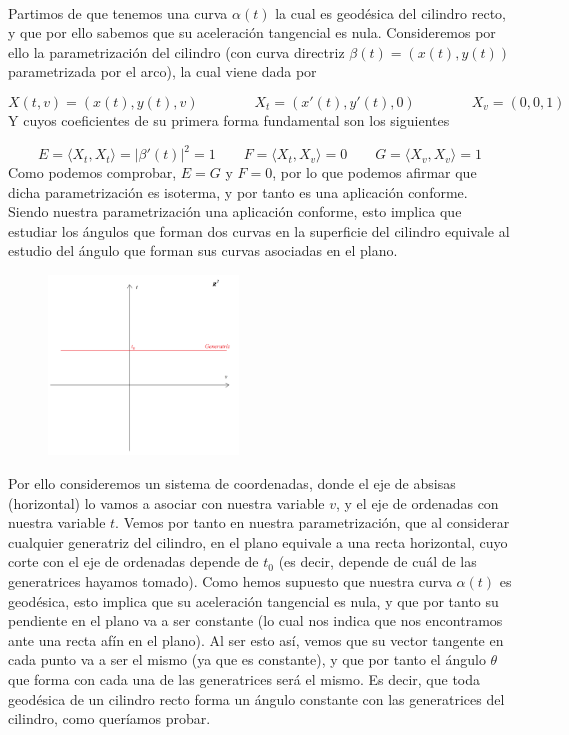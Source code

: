 \documentclass[fleqn]{article}
\begin{document}
    \fbox{$\Rightarrow$} \\

    Partimos de que tenemos una curva $\alpha(t)$ la cual es geodésica del cilindro recto, y que por ello sabemos que su aceleración tangencial es nula. 
    Consideremos por ello la parametrización del cilindro (con curva directriz $\beta(t)=(x(t), y(t))$ parametrizada por el arco), la cual viene dada por 

    $$X(t,v) = (x(t), y(t), v) \quad \quad \quad \quad X_t = (x'(t), y'(t), 0) \quad \quad \quad \quad X_v = (0,0,1)$$
    Y cuyos coeficientes de su primera forma fundamental son los siguientes
 
    $$
    E = \langle X_t,X_t \rangle = |\beta'(t)|^2 = 1 \quad \quad 
    F = \langle X_t,X_v \rangle = 0 \quad \quad 
    G = \langle X_v,X_v \rangle = 1
    $$
    Como podemos comprobar, $E=G$ y $F=0$, por lo que podemos afirmar que dicha parametrización es isoterma, y por tanto es una aplicación conforme. Siendo nuestra parametrización una 
    aplicación conforme, esto implica que estudiar los ángulos que forman dos curvas en la superficie del cilindro equivale al estudio del ángulo que forman sus curvas asociadas en el 
    plano. 

    \begin{figure} %
        \centering
        \includegraphics[width=0.45\textwidth]{ejercicio 5.png}
    \end{figure}

    Por ello consideremos un sistema de coordenadas, donde el eje de absisas (horizontal) lo vamos a asociar con nuestra variable $v$, y el eje de ordenadas con nuestra variable $t$.
    Vemos por tanto en nuestra parametrización, que al considerar cualquier generatriz del cilindro, en el plano equivale a una recta horizontal, cuyo corte con el eje de ordenadas depende de $t_0$ 
    (es decir, depende de cuál de las generatrices hayamos tomado). Como hemos supuesto que nuestra curva $\alpha(t)$ es geodésica, esto implica que su aceleración tangencial es nula,
    y que por tanto su pendiente en el plano va a ser constante (lo cual nos indica que nos encontramos ante una recta afín en el plano). Al ser esto así, vemos que su vector tangente 
    en cada punto va a ser el mismo (ya que es constante), y que por tanto el ángulo $\theta$ que forma con cada una de las generatrices será el mismo. Es decir, que toda geodésica de un cilindro recto
    forma un ángulo constante con las generatrices del cilindro, como queríamos probar.\\
\end{document}
